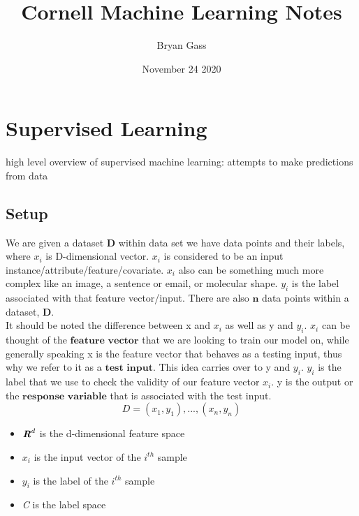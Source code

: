 \documentclass{article}
\title{Cornell Machine Learning Notes}
\author{Bryan Gass}
\date{November 24 2020}
\begin{document}
\maketitle

\tableofcontents
\newpage

\section{Supervised Learning} 
    high level overview of supervised machine learning: attempts to make predictions from data 
    
\subsection{Setup}
    We are given a dataset $\textbf{D}$ within data set we have data points and their labels, where $x_i$ is D-dimensional vector. $x_i$ is considered to be an input instance/attribute/feature/covariate. $x_i$ also can be something much more complex like an image, a sentence or email, or molecular shape.  $y_i$ is the label associated with that feature vector/input. There are also $\textbf{n}$ data points within a dataset, $\textbf{D}$. \\
    
    It should be noted the difference between x and $x_i$ as well as y and $y_i$. $x_i$ can be thought of the $\textbf{feature vector}$ that we are looking to train our model on, while generally speaking x is the feature vector that behaves as a testing input, thus why we refer to it as a $\textbf{test input}$. This idea carries over to y and $y_i$. $y_i$ is the label that we use to check the validity of our feature vector $x_i$. y is the output or the $\textbf{response variable}$ that is associated with the test input. \\
    
    \begin{equation}
        D = {(x_1, y_1), ..., (x_n, y_n)}
    \end{equation}
    
    \begin{itemize}
        \item 
            $\textbf{\textit{R}}^{d}$ is the d-dimensional feature space
            
        \item
            $x_i$ is the input vector of the $i^{th}$ sample
        
        \item   
            $y_i$ is the label of the $i^{th}$ sample
            
        \item
            \textit{C} is the label space \\
    \end{itemize} 
    
\end{document}
